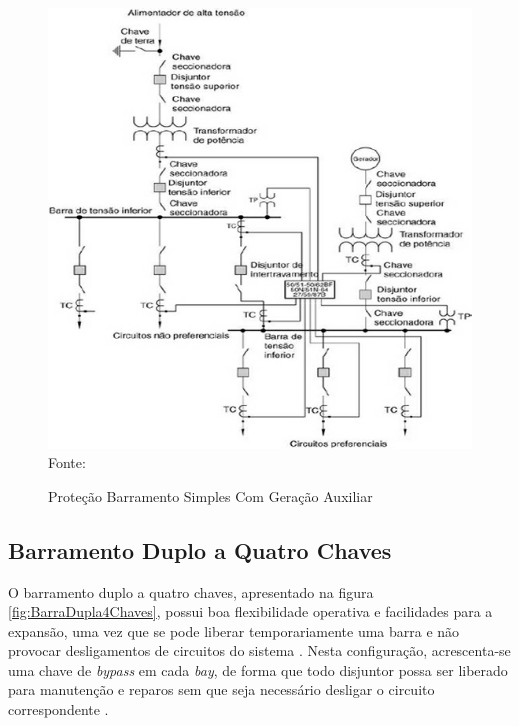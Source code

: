 \begin{figure}[!htb] 
    \centering
    \caption{Proteção Barramento Simples Com Geração Auxiliar}
    \includegraphics[scale = .75]{figuras/BarraComGeracaoAuxiliar.png}
    \\ Fonte: \cite{mamede2000protecao}
    \label{fig:BarraComGeracaoAuxiliar}
\end{figure}


\newpage

\subsection{Barramento Duplo a Quatro Chaves}

O barramento duplo a quatro chaves, apresentado na figura \ref{fig:BarraDupla4Chaves}, possui boa flexibilidade operativa e facilidades para a expansão, uma vez que se pode liberar temporariamente uma barra e não provocar desligamentos de circuitos do sistema \cite{holanda2016suel}. Nesta configuração, acrescenta-se uma chave de \textit{bypass} em cada \textit{bay}, de forma que todo disjuntor possa ser liberado para manutenção e reparos sem que seja necessário desligar o circuito correspondente \cite{frontin2013equipamentos}.


